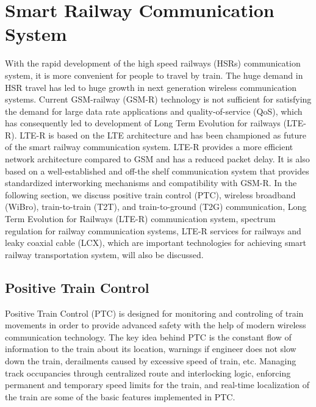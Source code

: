 \chapter{Smart Railway Communication System}
\label{chapter2}

With the rapid development of the high speed railways (HSRs) communication system, it is more convenient for people to travel by train. The huge demand in HSR travel has led to huge growth in next generation wireless communication systems. Current GSM-railway (GSM-R) technology is not sufficient for satisfying the demand for large data rate applications and quality-of-service (QoS), which has consequently led to development of Long Term Evolution for railways (LTE-R). LTE-R is based on the LTE architecture and has been championed as future of the smart railway communication system. LTE-R provides a more efficient network architecture compared to GSM and has a reduced packet delay. It is also based on a well-established and off-the shelf communication system that provides standardized interworking mechanisms and compatibility with GSM-R. In the following section, we discuss positive train control (PTC), wireless broadband (WiBro), train-to-train (T2T), and train-to-ground (T2G) communication, Long Term Evolution for Railways (LTE-R) communication system, spectrum regulation for railway communication systems, LTE-R services for railways and leaky coaxial cable (LCX), which are important technologies for achieving smart railway transportation system, will also be discussed.

\section{Positive Train Control}
Positive Train Control (PTC) is designed for monitoring and controling of train movements in order to provide advanced safety with the help of modern wireless communication technology. The key idea behind PTC is the constant flow of information to the train about its location, warnings if engineer does not slow down the train, derailments caused by excessive speed of train, etc. Managing track occupancies through centralized route and interlocking logic, enforcing permanent and temporary speed limits for the train, and real-time localization of the train are some of the basic features implemented in PTC. 


